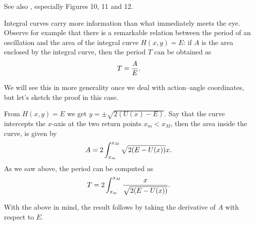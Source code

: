 \documentclass[english,fontsize=11pt,paper=a5,oneside]{scrbook}
\let\d\relax
\DeclareMathOperator{\d}{d}
\theoremstyle{definition}
\newenvironment{remark}
  {\pushQED{\qed}\renewcommand{\qedsymbol}{$\lozenge$}\remarkx}
  {\popQED\endremarkx}
\begin{document}
See also \cite[Chapter 2.4]{book:arnold}, especially Figures 10, 11 and 12.

\begin{remark}
    Integral curves carry more information than what immediately meets the eye.
    Observe for example that there is a remarkable relation between the period of an oscillation and the area of the integral curve $H(x,y) = E$:
    if $A$ is the area enclosed by the integral curve, then the period $T$ can be obtained as
    \begin{equation}
        T = \frac{\d A}{\d E}.
    \end{equation}
    
    We will see this in more generality once we deal with action--angle coordinates, but let's sketch the proof in this case.
    
    From $H(x,y) = E$ we get $y = \pm \sqrt{2(U(x) - E)}$. Say that the curve intercepts the $x$-axis at the two return points $x_m < x_M$, then the area inside the curve, is given by
    \begin{equation}
        A = 2\int_{x_m}^{x_M}\sqrt{2(E - U(x))} \d x.
    \end{equation}
    As we saw above, the period can be computed as
    \begin{equation}
        T = 2\int_{x_m}^{x_M} \frac{\d x}{\sqrt{2(E - U(x))}}.
    \end{equation}
    
    With the above in mind, the result follows by taking the derivative of $A$ with respect to $E$.
\end{remark}
\end{document}
